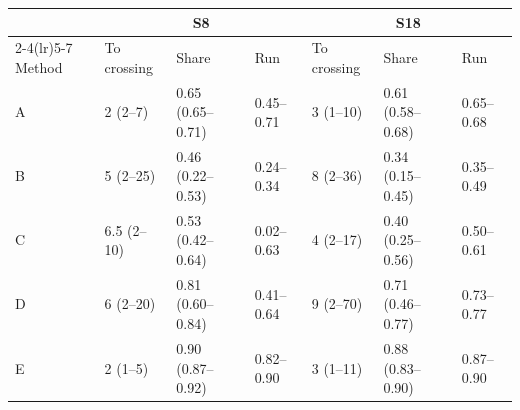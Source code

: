 \begin{tabular}{lllllll}\toprule
 & \multicolumn{3}{c}{S8} & \multicolumn{3}{c}{S18}\\\cmidrule(lr){2-4}\cmidrule(lr){5-7}
Method & To crossing & Share & Run & To crossing & Share & Run\\\midrule
A & 2 (2--7) & 0.65 (0.65--0.71) & 0.45--0.71 & 3 (1--10) & 0.61 (0.58--0.68) & 0.65--0.68\\
B & 5 (2--25) & 0.46 (0.22--0.53) & 0.24--0.34 & 8 (2--36) & 0.34 (0.15--0.45) & 0.35--0.49\\
C & 6.5 (2--10) & 0.53 (0.42--0.64) & 0.02--0.63 & 4 (2--17) & 0.40 (0.25--0.56) & 0.50--0.61\\
D & 6 (2--20) & 0.81 (0.60--0.84) & 0.41--0.64 & 9 (2--70) & 0.71 (0.46--0.77) & 0.73--0.77\\
E & 2 (1--5) & 0.90 (0.87--0.92) & 0.82--0.90 & 3 (1--11) & 0.88 (0.83--0.90) & 0.87--0.90\\
\bottomrule\end{tabular}
